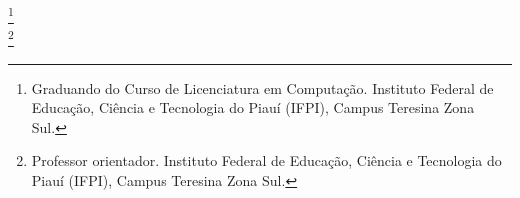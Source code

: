 
\imprimircapa



\imprimirfolhaderosto*



%


%







%


%

\begin{center}{\ABNTEXchapterfont\bfseries\MakeUppercase{\imprimirtitulo}}
\end{center}


\flushright 
      
      \autornomecompleto\footnote{Graduando do Curso de Licenciatura em Computação. Instituto Federal de Educação, Ciência e Tecnologia do Piauí (IFPI), Campus Teresina Zona Sul.} \\
      \profnomecompleto \footnote{Professor orientador. Instituto Federal de Educação, Ciência e Tecnologia do Piauí (IFPI), Campus Teresina Zona Sul.}
      

\justifying 




